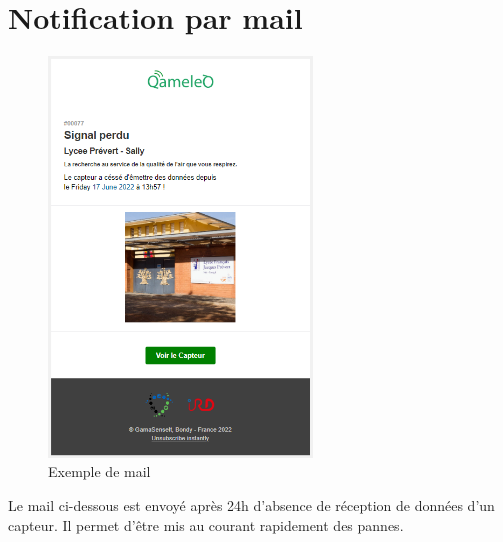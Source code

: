 \section{Notification par mail}\label{sec:notification-par-mail}

    \begin{figure}[H]
        \begin{center}
            \includegraphics[width=7cm]{resources/mail}
        \end{center}
        \caption{Exemple de mail}\label{fig:exemple-de-mail}
    \end{figure}

    Le mail ci-dessous est envoyé après 24h d'absence de réception de données d'un capteur.
    Il permet d'être mis au courant rapidement des pannes.